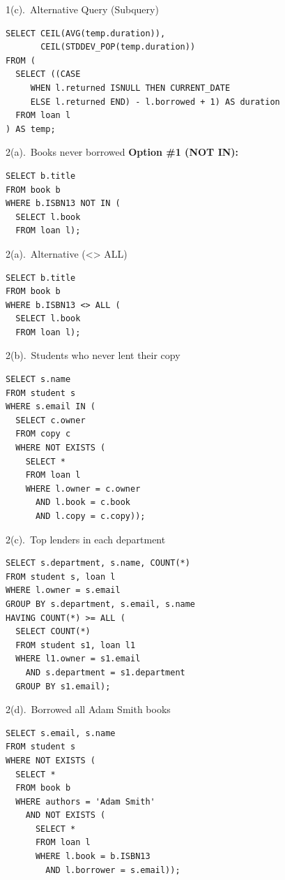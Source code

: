 \documentclass{beamer}
\begin{document}
\begin{frame}[fragile]{1(c).\ Alternative Query (Subquery)}
\begin{lstlisting}
SELECT CEIL(AVG(temp.duration)),
       CEIL(STDDEV_POP(temp.duration))
FROM (
  SELECT ((CASE
     WHEN l.returned ISNULL THEN CURRENT_DATE
     ELSE l.returned END) - l.borrowed + 1) AS duration
  FROM loan l
) AS temp;
\end{lstlisting}
\end{frame}

\begin{frame}[fragile]{2(a).\ Books never borrowed}
\textbf{Option \#1 (NOT IN):}
\begin{lstlisting}
SELECT b.title
FROM book b
WHERE b.ISBN13 NOT IN (
  SELECT l.book
  FROM loan l);
\end{lstlisting}
\end{frame}

\begin{frame}[fragile]{2(a).\ Alternative (<> ALL)}
\begin{lstlisting}
SELECT b.title
FROM book b
WHERE b.ISBN13 <> ALL (
  SELECT l.book
  FROM loan l);
\end{lstlisting}
\end{frame}

\begin{frame}[fragile]{2(b).\ Students who never lent their copy}
\begin{lstlisting}
SELECT s.name
FROM student s
WHERE s.email IN (
  SELECT c.owner
  FROM copy c
  WHERE NOT EXISTS (
    SELECT *
    FROM loan l
    WHERE l.owner = c.owner
      AND l.book = c.book
      AND l.copy = c.copy));
\end{lstlisting}
\end{frame}

\begin{frame}[fragile]{2(c).\ Top lenders in each department}
\begin{lstlisting}
SELECT s.department, s.name, COUNT(*)
FROM student s, loan l
WHERE l.owner = s.email
GROUP BY s.department, s.email, s.name
HAVING COUNT(*) >= ALL (
  SELECT COUNT(*)
  FROM student s1, loan l1
  WHERE l1.owner = s1.email
    AND s.department = s1.department
  GROUP BY s1.email);
\end{lstlisting}
\end{frame}

\begin{frame}[fragile]{2(d).\ Borrowed all Adam Smith books}
\begin{lstlisting}
SELECT s.email, s.name
FROM student s
WHERE NOT EXISTS (
  SELECT *
  FROM book b
  WHERE authors = 'Adam Smith'
    AND NOT EXISTS (
      SELECT *
      FROM loan l
      WHERE l.book = b.ISBN13
        AND l.borrower = s.email));
\end{lstlisting}
\end{frame}
\end{document}
